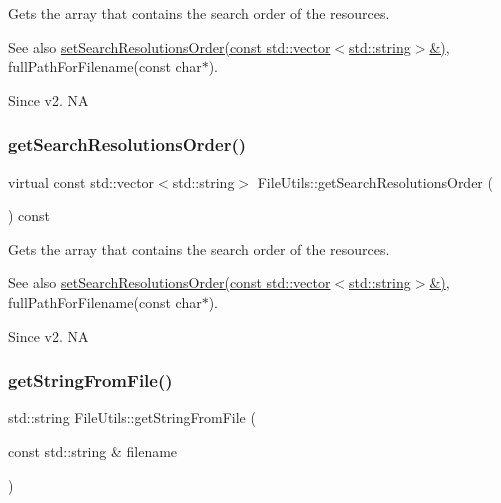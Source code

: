 Gets the array that contains the search order of the resources.

\begin{DoxySeeAlso}{See also}
\hyperlink{classFileUtils_ac99445fa3112510c8f019c9f38a4779f}{set\+Search\+Resolutions\+Order(const std\+::vector$<$std\+::string$>$\&)}, full\+Path\+For\+Filename(const char$\ast$). 
\end{DoxySeeAlso}
\begin{DoxySince}{Since}
v2.  NA 
\end{DoxySince}
\mbox{\label{classFileUtils_a3f1af62189d1c9f5fc944d38fc6265a6}} 
\subsubsection{\texorpdfstring{get\+Search\+Resolutions\+Order()}{getSearchResolutionsOrder()}\hspace{0.1cm}{\footnotesize\ttfamily [2/2]}}
{\footnotesize\ttfamily virtual const std\+::vector$<$std\+::string$>$ File\+Utils\+::get\+Search\+Resolutions\+Order (\begin{DoxyParamCaption}{ }\end{DoxyParamCaption}) const\hspace{0.3cm}{\ttfamily [virtual]}}

Gets the array that contains the search order of the resources.

\begin{DoxySeeAlso}{See also}
\hyperlink{classFileUtils_ac99445fa3112510c8f019c9f38a4779f}{set\+Search\+Resolutions\+Order(const std\+::vector$<$std\+::string$>$\&)}, full\+Path\+For\+Filename(const char$\ast$). 
\end{DoxySeeAlso}
\begin{DoxySince}{Since}
v2.  NA 
\end{DoxySince}
\mbox{\label{classFileUtils_a8e420b897f0e359c077976c31954e265}} 
\subsubsection{\texorpdfstring{get\+String\+From\+File()}{getStringFromFile()}\hspace{0.1cm}{\footnotesize\ttfamily [1/3]}}
{\footnotesize\ttfamily std\+::string File\+Utils\+::get\+String\+From\+File (\begin{DoxyParamCaption}\item[{const std\+::string \&}]{filename }\end{DoxyParamCaption})\hspace{0.3cm}{\ttfamily [virtual]}}

